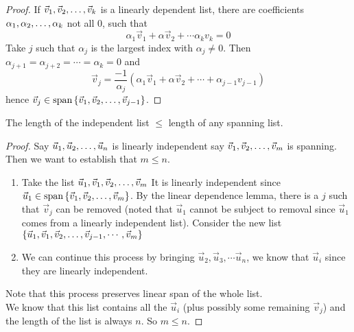 \begin{proof}
    If ${\vec v}_1,{\vec v}_2, \ldots, {\vec v}_{k}$ is a linearly dependent list, there are coefficients ${\alpha}_1,{\alpha}_2, \ldots, {\alpha}_{k}$ not all $0$, such that 
    \[ \alpha_1 \vec v_1 + \alpha \vec v_2 + \cdots \alpha_k v_k = 0\]
    Take $j$ such that $\alpha_j$ is the largest index with $\alpha_j \neq 0$. Then $\alpha_{j + 1}=  \alpha_{j + 2} = \cdots = \alpha_k = 0$ and \[ \vec v_j = \frac{-1}{\alpha_j} (\alpha_1 \vec v_1 + \alpha \vec v_2 + \cdots + \alpha_{j - 1} v_{j-1})\] hence $\vec v_j \in \text{span} \left\{ {\vec v}_1,{\vec v}_2, \ldots, {\vec v}_{j-1} \right\}$.
\end{proof}
\begin{remark}
    The length of the independent list $\leq$ length of any spanning list. 
\end{remark}
\begin{proof}
    Say ${\vec u}_1,{\vec u}_2, \ldots, {\vec u}_{n}$ is linearly independent say ${\vec v}_1,{\vec v}_2, \ldots, {\vec v}_{m}$ is spanning. Then we want to establish that $ m \leq n$. 
    \begin{enumerate}[label = {Step \arabic*.}]
        \item Take the list $\vec u_1, {\vec v}_1,{\vec v}_2, \ldots, {\vec v}_{m}$ It is linearly independent since $\vec u_1 \in \text{span} \left\{ {\vec v}_1,{\vec v}_2, \ldots, {\vec v}_{m} \right\}$. By the linear dependence lemma, there is a $j$ such that $\vec v_j$ can be removed (noted that $\vec u_1$ cannot be subject to removal since $\vec u_1$ comes from a linearly independent list). Consider the new list $\left\{ \vec u_1, {\vec v}_1,{\vec v}_2, \ldots, {\vec v}_{j-1} , \cdots, \vec v_m\right\}$
        \item We can continue this process by bringing $\vec u_2, \vec u_3, \cdots \vec u_n$, we know that $\vec u_i$ since they are linearly independent.
    \end{enumerate}
    Note that this process preserves linear span of the whole list.  \\
    We know that this list contains all the $\vec u_i$ (plus possibly some remaining $\vec v_j$) and the length of the list is always $n$. So $\boxed{m \leq n}$.
\end{proof}
